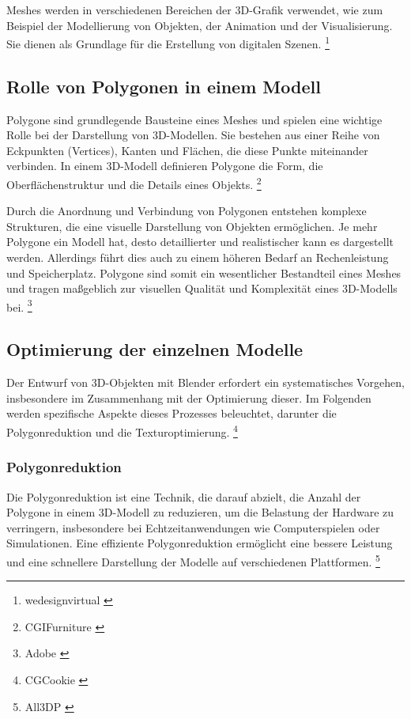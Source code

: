 Meshes werden in verschiedenen Bereichen der 3D-Grafik verwendet, wie zum Beispiel der Modellierung von Objekten, der Animation und der Visualisierung. Sie dienen als Grundlage für die Erstellung von digitalen Szenen. \footnote{wedesignvirtual \cite{WhatareMeshes}}

\subsection{Rolle von Polygonen in einem Modell}
Polygone sind grundlegende Bausteine eines Meshes und spielen eine wichtige Rolle bei der Darstellung von 3D-Modellen. Sie bestehen aus einer Reihe von Eckpunkten (Vertices), Kanten und Flächen, die diese Punkte miteinander verbinden. In einem 3D-Modell definieren Polygone die Form, die Oberflächenstruktur und die Details eines Objekts. \footnote{CGIFurniture \cite{What are Polygons}}

Durch die Anordnung und Verbindung von Polygonen entstehen komplexe Strukturen, die eine visuelle Darstellung von Objekten ermöglichen. Je mehr Polygone ein Modell hat, desto detaillierter und realistischer kann es dargestellt werden. Allerdings führt dies auch zu einem höheren Bedarf an Rechenleistung und Speicherplatz. Polygone sind somit ein wesentlicher Bestandteil eines Meshes und tragen maßgeblich zur visuellen Qualität und Komplexität eines 3D-Modells bei. \footnote{Adobe \cite{3D Polygon Modeling}}

\subsection{Optimierung der einzelnen Modelle}
Der Entwurf von 3D-Objekten mit Blender erfordert ein systematisches Vorgehen, insbesondere im Zusammenhang mit der Optimierung dieser. Im Folgenden werden spezifische Aspekte dieses Prozesses beleuchtet, darunter die Polygonreduktion und die Texturoptimierung. \footnote{CGCookie \cite{Ways to optimize Game Assets}}

\subsubsection{Polygonreduktion}
Die Polygonreduktion ist eine Technik, die darauf abzielt, die Anzahl der Polygone in einem 3D-Modell zu reduzieren, um die Belastung der Hardware zu verringern, insbesondere bei Echtzeitanwendungen wie Computerspielen oder Simulationen. Eine effiziente Polygonreduktion ermöglicht eine bessere Leistung und eine schnellere Darstellung der Modelle auf verschiedenen Plattformen. \footnote{All3DP \cite{How to reduce Polygons}}



